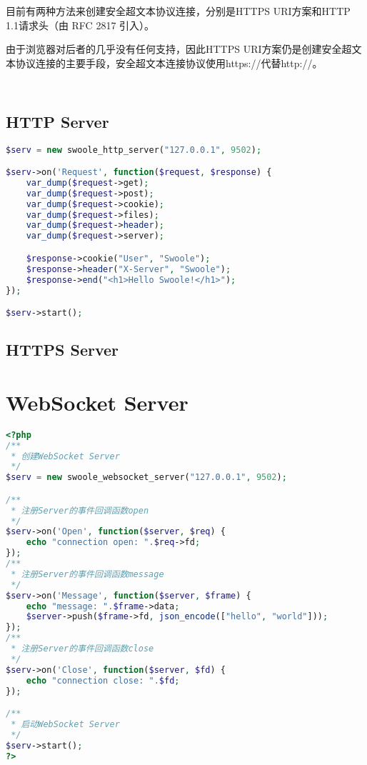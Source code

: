 目前有两种方法来创建安全超文本协议连接，分别是HTTPS URI方案和HTTP 1.1请求头（由 RFC 2817 引入）。

由于浏览器对后者的几乎没有任何支持，因此HTTPS URI方案仍是创建安全超文本协议连接的主要手段，安全超文本连接协议使用https://代替http://。




\begin{lstlisting}[language=PHP]

\end{lstlisting}




\begin{lstlisting}[language=PHP]

\end{lstlisting}


\section{HTTP Server}


\begin{lstlisting}[language=PHP]
$serv = new swoole_http_server("127.0.0.1", 9502);

$serv->on('Request', function($request, $response) {
    var_dump($request->get);
    var_dump($request->post);
    var_dump($request->cookie);
    var_dump($request->files);
    var_dump($request->header);
    var_dump($request->server);

    $response->cookie("User", "Swoole");
    $response->header("X-Server", "Swoole");
    $response->end("<h1>Hello Swoole!</h1>");
});

$serv->start();
\end{lstlisting}


\section{HTTPS Server}





\chapter{WebSocket Server}


\begin{lstlisting}[language=PHP]
<?php
/**
 * 创建WebSocket Server
 */
$serv = new swoole_websocket_server("127.0.0.1", 9502);

/**
 * 注册Server的事件回调函数open
 */
$serv->on('Open', function($server, $req) {
    echo "connection open: ".$req->fd;
});
/**
 * 注册Server的事件回调函数message
 */
$serv->on('Message', function($server, $frame) {
    echo "message: ".$frame->data;
    $server->push($frame->fd, json_encode(["hello", "world"]));
});
/**
 * 注册Server的事件回调函数close
 */
$serv->on('Close', function($server, $fd) {
    echo "connection close: ".$fd;
});

/**
 * 启动WebSocket Server
 */
$serv->start();
?>
\end{lstlisting}


